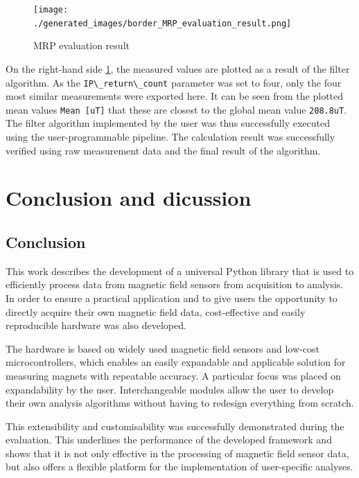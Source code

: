 \begin{figure}
\centering
\texttt{[image: ./generated\_images/border\_MRP\_evaluation\_result.png]}
\caption{MRP evaluation result \label{MRP_evaluation_result.png}}
\end{figure}

On the right-hand side \ref{MRP_evaluation_result.png}, the measured
values are plotted as a result of the filter algorithm. As the
\passthrough{\lstinline!IP\_return\_count!} parameter was set to four,
only the four most similar measurements were exported here. It can be
seen from the plotted mean values \passthrough{\lstinline!Mean [uT]!}
that these are closest to the global mean value
\passthrough{\lstinline!208.8uT!}. The filter algorithm implemented by
the user was thus successfully executed using the user-programmable
pipeline. The calculation result was successfully verified using raw
measurement data and the final result of the algorithm.

\hypertarget{conclusion-and-dicussion}{%
\chapter{Conclusion and dicussion}\label{conclusion-and-dicussion}}

\hypertarget{conclusion}{%
\section{Conclusion}\label{conclusion}}

This work describes the development of a universal Python library that
is used to efficiently process data from magnetic field sensors from
acquisition to analysis. In order to ensure a practical application and
to give users the opportunity to directly acquire their own magnetic
field data, cost-effective and easily reproducible hardware was also
developed.

The hardware is based on widely used magnetic field sensors and low-cost
microcontrollers, which enables an easily expandable and applicable
solution for measuring magnets with repeatable accuracy. A particular
focus was placed on expandability by the user. Interchangeable modules
allow the user to develop their own analysis algorithms without having
to redesign everything from scratch.

This extensibility and customisability was successfully demonstrated
during the evaluation. This underlines the performance of the developed
framework and shows that it is not only effective in the processing of
magnetic field sensor data, but also offers a flexible platform for the
implementation of user-specific analyses.


